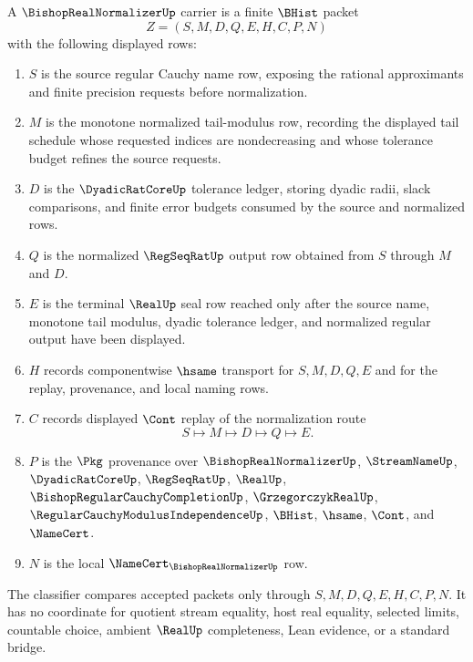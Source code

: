 \begin{definition}
\label{def:bishop-real-normalizer-carrier}
A $\BishopRealNormalizerUp$ carrier is a finite $\BHist$ packet
$$
Z=(S,M,D,Q,E,H,C,P,N)
$$
with the following displayed rows:
\begin{enumerate}
\item $S$ is the source regular Cauchy name row, exposing the rational approximants and finite precision requests before normalization.
\item $M$ is the monotone normalized tail-modulus row, recording the displayed tail schedule whose requested indices are nondecreasing and whose tolerance budget refines the source requests.
\item $D$ is the $\DyadicRatCoreUp$ tolerance ledger, storing dyadic radii, slack comparisons, and finite error budgets consumed by the source and normalized rows.
\item $Q$ is the normalized $\RegSeqRatUp$ output row obtained from $S$ through $M$ and $D$.
\item $E$ is the terminal $\RealUp$ seal row reached only after the source name, monotone tail modulus, dyadic tolerance ledger, and normalized regular output have been displayed.
\item $H$ records componentwise $\hsame$ transport for $S,M,D,Q,E$ and for the replay, provenance, and local naming rows.
\item $C$ records displayed $\Cont$ replay of the normalization route
$$
S\longmapsto M\longmapsto D\longmapsto Q\longmapsto E .
$$
\item $P$ is the $\Pkg$ provenance over $\BishopRealNormalizerUp$, $\StreamNameUp$, $\DyadicRatCoreUp$, $\RegSeqRatUp$, $\RealUp$, $\BishopRegularCauchyCompletionUp$, $\GrzegorczykRealUp$, $\RegularCauchyModulusIndependenceUp$, $\BHist$, $\hsame$, $\Cont$, and $\NameCert$.
\item $N$ is the local $\NameCert_{\BishopRealNormalizerUp}$ row.
\end{enumerate}
The classifier compares accepted packets only through $S,M,D,Q,E,H,C,P,N$. It has no coordinate for quotient stream equality, host real equality, selected limits, countable choice, ambient $\RealUp$ completeness, Lean evidence, or a standard bridge.
\end{definition}

